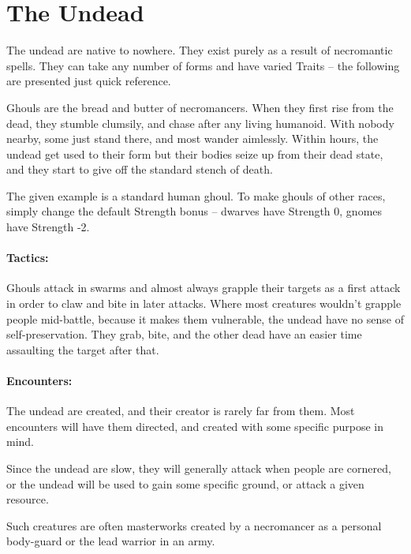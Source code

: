 \section{The Undead}

\begin{multicols}{2}

The undead are native to nowhere.
They exist purely as a result of necromantic spells.
They can take any number of forms and have varied Traits -- the following are presented just quick reference.

\label{ghoul}

Ghouls are the bread and butter of necromancers.
When they first rise from the dead, they stumble clumsily, and chase after any living humanoid.
With nobody nearby, some just stand there, and most wander aimlessly.
Within hours, the undead get used to their form but their bodies seize up from their dead state, and they start to give off the standard stench of death.

The given example is a standard human ghoul.
To make ghouls of other races, simply change the default Strength bonus -- dwarves have Strength 0, gnomes have Strength -2.

\paragraph{Tactics:}
Ghouls attack in swarms and almost always grapple their targets as a first attack in order to claw and bite in later attacks.
Where most creatures wouldn't grapple people mid-battle, because it makes them vulnerable, the undead have no sense of self-preservation.
They grab, bite, and the other dead have an easier time assaulting the target after that.

\paragraph{Encounters:}
The undead are created, and their creator is rarely far from them.
Most encounters will have them directed, and created with some specific purpose in mind.

Since the undead are slow, they will generally attack when people are cornered, or the undead will be used to gain some specific ground, or attack a given resource.

\label{ghast}


Such creatures are often masterworks created by a necromancer as a personal body-guard or the lead warrior in an army.


\end{multicols}
